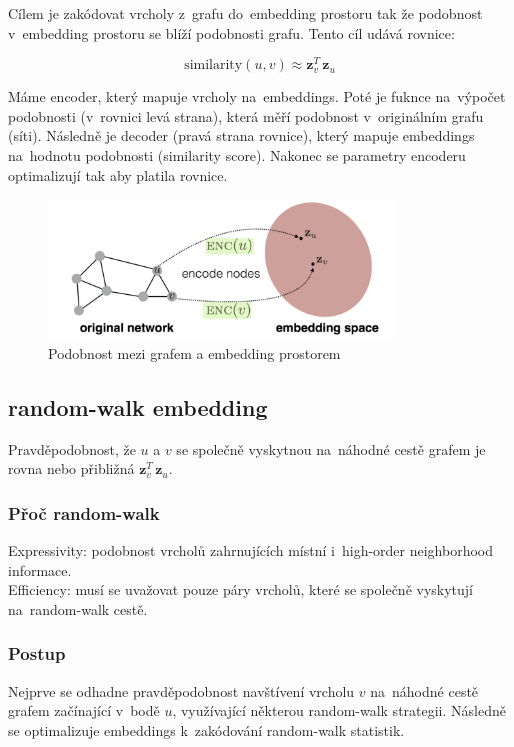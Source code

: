 Cílem je zakódovat vrcholy z~grafu do~embedding prostoru tak že podobnost v~embedding prostoru se blíží podobnosti grafu.
Tento cíl udává rovnice:

$$\text{similarity}(u,v)\approx \mathbf{z}_{v}^{T}\,\mathbf{z}_{u}$$

Máme encoder, který mapuje vrcholy na~embeddings. 
Poté je fuknce na~výpočet podobnosti (v~rovnici levá strana), která měří podobnost v~originálním grafu (síti).
Následně je decoder (pravá strana rovnice), který mapuje embeddings na~hodnotu podobnosti (similarity score).
Nakonec se parametry encoderu optimalizují tak aby platila rovnice.

\begin{figure}[ht]
    \centering
    \includegraphics[height=10em]{images/11_similarity}
    \caption{Podobnost mezi grafem a embedding prostorem}
\end{figure}

\subsection{random-walk embedding}

Pravděpodobnost, že $u$ a $v$ se společně vyskytnou na~náhodné cestě grafem je rovna nebo přibližná $\mathbf{z}_{v}^{T}\,\mathbf{z}_{u}$.

\subsubsection{Přoč random-walk}

{}Expressivity: podobnost vrcholů zahrnujících místní i~high-order neighborhood informace.
\\Efficiency: musí se uvažovat pouze páry vrcholů, které se společně vyskytují na~random-walk cestě.

\subsubsection{Postup}

Nejprve se odhadne pravděpodobnost navštívení vrcholu $v$ na~náhodné cestě grafem začínající v~bodě $u$, využívající některou random-walk strategii. 
Následně se optimalizuje embeddings k~zakódování random-walk statistik.

